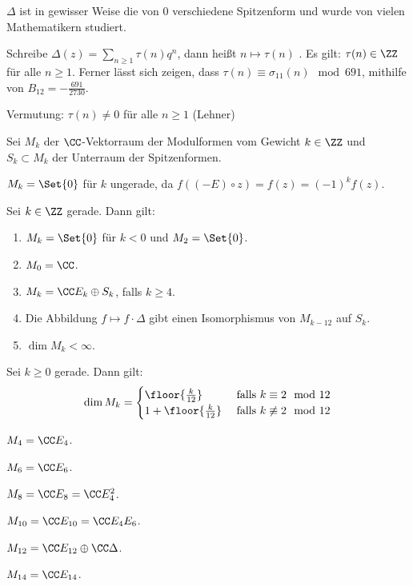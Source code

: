 \begin{beme}
$\Delta$ ist in gewisser Weise die  von 0 verschiedene Spitzenform und wurde von vielen Mathematikern studiert.

\begin{bsp-list}
\item Schreibe $\Delta(z) = \sum_{n \geq 1} \tau (n) q^n$, dann heißt $n \mapsto \tau (n)$ . Es gilt: $\tau (n) \in \ZZ$ für alle $n \geq 1$. Ferner lässt sich zeigen, dass $\tau (n) \equiv \sigma_{11}(n) \mod 691$, mithilfe von $B_{12} = - \frac{691}{2730}$.
\item Vermutung: $\tau (n) \neq 0$ für alle $n \geq 1$ (Lehner)
\end{bsp-list}

\end{beme}


Sei $M_k$ der $\CC$-Vektorraum der Modulformen vom Gewicht $k \in \ZZ$ und $S_k \subset M_k$ der Unterraum der Spitzenformen.

\begin{beme}
$M_k = \Set {0}$ für $k$ ungerade, da $f((-E) \circ z) = f(z) = (-1)^k f(z)$.
\end{beme}

\begin{satz}\label{M_k1}
Sei $k \in \ZZ$ gerade. Dann gilt:
\begin{enumerate}
	\item $M_k = \Set {0}$ für $k < 0$ und $M_2 = \Set {0}$.
	\item $M_0 = \CC$.
	\item $M_k = \CC E_k \oplus S_k$, falls $k \geq 4$.
	\item Die Abbildung $f \mapsto f \cdot \Delta$ gibt einen Isomorphismus von $M_{k-12}$ auf $S_k$.
	\item $\dim M_k < \infty$.
\end{enumerate}
\end{satz}

\begin{satz}
Sei $k \geq 0$ gerade. Dann gilt:
\[
\dim M_k = \begin{cases}
\floor{\frac k{12}} & \text{ falls } k \equiv 2 \mod 12\\
1 + \floor{\frac k{12}} & \text{ falls } k \not \equiv 2 \mod 12
\end{cases}
\]
\end{satz}

\begin{bsp-list}\label{M_k2}
\item $M_4 = \CC E_4$.
\item $M_6 = \CC E_6$.
\item $M_8 = \CC E_8 = \CC E_4^2$.
\item $M_{10} = \CC E_{10} = \CC E_4 E_6$.
\item $M_{12} = \CC E_{12} \oplus \CC \Delta$.
\item $M_{14} = \CC E_{14}$.
\end{bsp-list}

